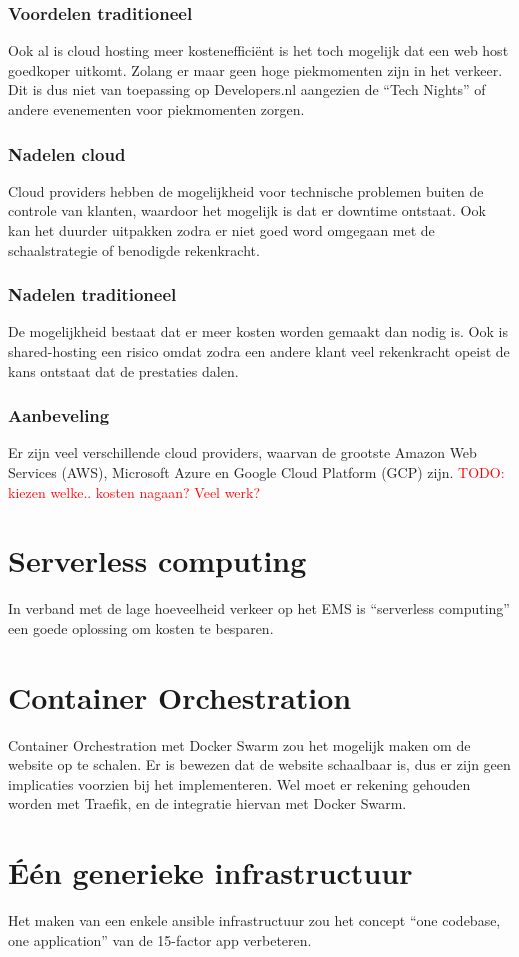 \subsubsection{Voordelen traditioneel} 
Ook al is cloud hosting meer kostenefficiënt is het toch mogelijk dat een web host goedkoper uitkomt. Zolang er maar geen hoge piekmomenten zijn in het verkeer. Dit is dus niet van toepassing op Developers.nl aangezien de \enquote{Tech Nights} of andere evenementen voor piekmomenten zorgen. 

\subsubsection{Nadelen cloud}
Cloud providers hebben de mogelijkheid voor technische problemen buiten de controle van klanten, waardoor het mogelijk is dat er downtime ontstaat. Ook kan het duurder uitpakken zodra er niet goed word omgegaan met de schaalstrategie of benodigde rekenkracht.

\subsubsection{Nadelen traditioneel}
De mogelijkheid bestaat dat er meer kosten worden gemaakt dan nodig is. Ook is shared-hosting een risico omdat zodra een andere klant veel rekenkracht opeist de kans ontstaat dat de prestaties dalen.

\subsubsection{Aanbeveling}
Er zijn veel verschillende cloud providers, waarvan de grootste Amazon Web Services (AWS), Microsoft Azure en Google Cloud Platform (GCP) zijn. \textcolor{red}{TODO: kiezen welke.. kosten nagaan? Veel werk?} %

\section{Serverless computing}
In verband met de lage hoeveelheid verkeer op het EMS is \enquote{serverless computing} een goede oplossing om kosten te besparen.

\section{Container Orchestration}
Container Orchestration met Docker Swarm zou het mogelijk maken om de website op te schalen. Er is bewezen dat de website schaalbaar is, dus er zijn geen implicaties voorzien bij het implementeren. Wel moet er rekening gehouden worden met Traefik, en de integratie hiervan met Docker Swarm.

\section{Één generieke infrastructuur}
Het maken van een enkele ansible infrastructuur zou het concept \enquote{one codebase, one application} van de 15-factor app verbeteren.